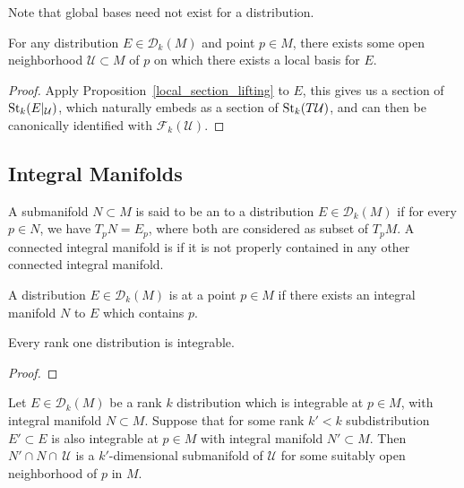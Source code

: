 \documentclass{lkx_paper}
\begin{document}
Note that global bases need not exist for a distribution.

\begin{example}
\end{example}

\begin{proposition}
	For any distribution $E\in \mathscr{D}_k(M)$ and point $p\in M$, there exists some open neighborhood $\mathcal{U}\subset M$ of $p$ on which there exists a local basis for $E$.
\end{proposition}

\begin{proof}
	Apply Proposition~\ref{local_section_lifting} to $E$, this gives us a section of $\mathrm{St}_k(E|_\mathcal{U})$, which naturally embeds as a section of $\mathrm{St}_k(T\mathcal{U})$, and can then be canonically identified with $\mathcal{F}_k(\mathcal{U})$.
\end{proof}

\subsection{Integral Manifolds}

\begin{definition}
	A submanifold $N\subset M$ is said to be an  to a distribution $E\in \mathscr{D}_k(M)$ if for every $p\in N$, we have $T_p N = E_p$, where both are considered as subset of $T_p M$. A connected integral manifold is  if it is not properly contained in any other connected integral manifold.
\end{definition}

\begin{definition}
	A distribution $E \in \mathscr{D}_k(M)$ is  at a point $p\in M$ if there exists an integral manifold $N$ to $E$ which contains $p$.
\end{definition}

\begin{proposition}
	Every rank one distribution is integrable.
\end{proposition}

\begin{proof}

\end{proof}

\begin{proposition}
	Let $E\in \mathscr{D}_k(M)$ be a rank $k$ distribution which is integrable at $p\in M$, with integral manifold $N\subset M$. Suppose that for some rank $k'< k$ subdistribution $E'\subset E$ is also integrable at $p\in M$ with integral manifold $N'\subset M$. Then $N'\cap N \cap\, \mathcal{U}$ is a $k'$-dimensional submanifold of $\mathcal{U}$ for some suitably open neighborhood of $p$ in $M$.
\end{proposition}
\end{document}
